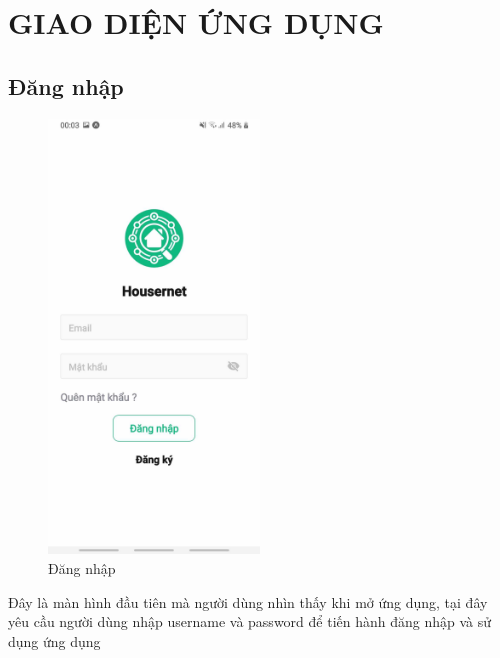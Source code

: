 \section{GIAO DIỆN ỨNG DỤNG}
\subsection{Đăng nhập}
\begin{figure}[H]
    \centering
    \includegraphics[width=0.5\textwidth]{Images/app_image/app_6.jpg}
    \caption{Đăng nhập}
\end{figure}
Đây là màn hình đầu tiên mà người dùng nhìn thấy khi mở ứng dụng, tại đây yêu cầu người dùng nhập username và password để tiến hành đăng nhập và sử dụng ứng dụng
